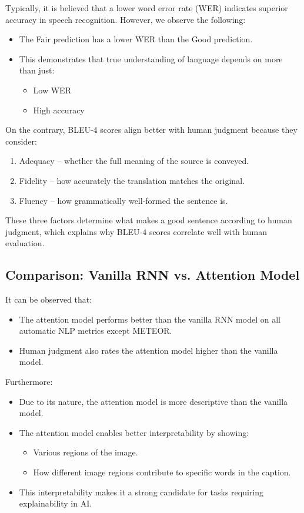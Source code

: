 \documentclass{article}
\begin{document}
Typically, it is believed that a lower word error rate (WER) indicates superior accuracy in speech recognition. However, we observe the following:
\begin{itemize}
    \item The Fair prediction has a lower WER than the Good prediction.
    \item This demonstrates that true understanding of language depends on more than just:
    \begin{itemize}
        \item Low WER
        \item High accuracy
    \end{itemize}
\end{itemize}

On the contrary, BLEU-4 scores align better with human judgment because they consider:
\begin{enumerate}
    \item Adequacy – whether the full meaning of the source is conveyed.
    \item Fidelity – how accurately the translation matches the original.
    \item Fluency – how grammatically well-formed the sentence is.
\end{enumerate}
These three factors determine what makes a good sentence according to human judgment, which explains why BLEU-4 scores correlate well with human evaluation.

\subsection{Comparison: Vanilla RNN vs. Attention Model}

It can be observed that:
\begin{itemize}
    \item The attention model performs better than the vanilla RNN model on all automatic NLP metrics except METEOR.
    \item Human judgment also rates the attention model higher than the vanilla model.
\end{itemize}

Furthermore:
\begin{itemize}
    \item Due to its nature, the attention model is more descriptive than the vanilla model.
    \item The attention model enables better interpretability by showing:
    \begin{itemize}
        \item Various regions of the image.
        \item How different image regions contribute to specific words in the caption.
    \end{itemize}
    \item This interpretability makes it a strong candidate for tasks requiring explainability in AI.
\end{itemize}
\end{document}
